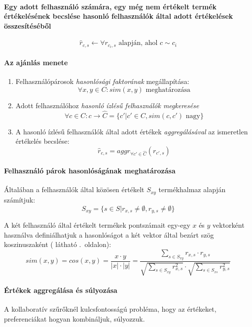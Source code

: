 \documentclass[
]{thesis-ekf}
\theoremstyle{definition}
\theoremstyle{remark}
\begin{document}
\paragraph{Egy adott felhasználó számára, egy még nem értékelt termék értékelésének becslése hasonló felhasználók által adott értékelések összesítéséből}
\[\hat{r}_{c,s}\leftarrow \forall r_{c_{i},s} \text{ alapján, ahol } c\sim c_{i}\]\cite{werner-ajanlo-rendszer}

\paragraph{Az ajánlás menete}
\begin{enumerate}
	\item Felhasználópárosok \emph{hasonlósági faktorának} megállapítása: 
	\[\forall{x,y}\in C\colon sim(x,y) \text{ meghatározása}\]
	
	\item Adott felhasználóhoz \emph{hasonló ízlésű felhasználók megkeresése}	\[\forall{c}\in C\colon c \rightarrow \hat{C}= \{c' | c'\in C, sim(c,c') \text{ nagy}\}\]
	
	\item A hasonló ízlésű felhasználók által adott értékek \emph{aggregálásával} az ismeretlen értékelés becslése:
	\[\hat{r}_{c,s}=aggr_{\forall c'\in \hat{C}}(r_{c',s})\]
	
\end{enumerate}\cite{werner-ajanlo-rendszer, wiki-collaborative-filtering}

\paragraph{Felhasználó párok hasonlóságának meghatározása}
Általában a felhasználók által közösen értékelt $S_{xy}$ termékhalmaz alapján számítjuk:
\[S_{xy}=\{s\in S | r_{x,s}\neq \emptyset, r_{y,s} \neq \emptyset \}\]



A két felhasználó által értékelt termékek pontszámait egy-egy ${x}$ és ${y}$ vektorként használva definiálhatjuk a hasonlóságot a két vektor által bezárt szög koszinuszaként ( látható .~oldalon):
\[sim(x,y)=cos({x}, {y})=\frac{{x} \cdot {y}}{|{x}|\cdot |{y}|}=\frac{\sum_{s \in S_{xy}}r_{x,s}\cdot r_{y,s}}{\sqrt{\sum_{s \in S_{xy}}r^{2}_{x,s}}\cdot\sqrt{\sum_{s \in S_{xs}}r^{2}_{y,s}}}\]
\cite{werner-ajanlo-rendszer}

\paragraph{Értékek aggregálása és súlyozása}
A kollaboratív szűrőknél kulcsfontosságú probléma, hogy az értékeket, preferenciákat hogyan kombináljuk, súlyozzuk.\cite{wiki-collaborative-filtering}
\end{document}
